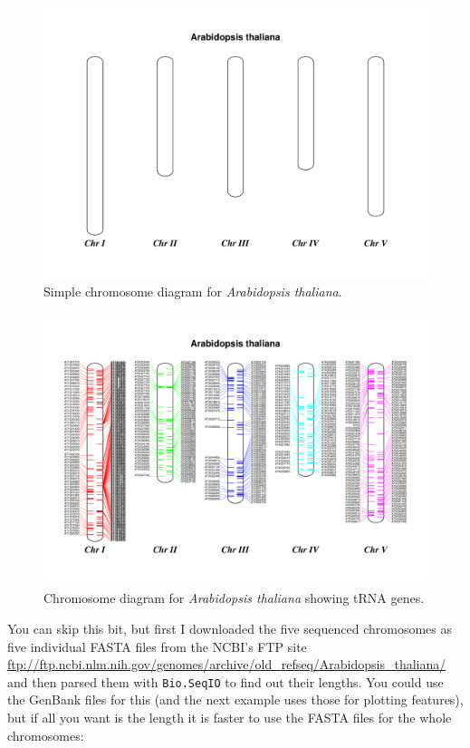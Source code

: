 \begin{latexonly}
\begin{figure}[p]
\centering
\includegraphics[scale=0.45]{images/simple_chrom.pdf}
\caption{Simple chromosome diagram for \textit{Arabidopsis thaliana}.}
\label{fig:simplechromosome}
\end{figure}
\begin{figure}[p]
\centering
\includegraphics[scale=0.45]{images/tRNA_chrom.pdf}
\caption{Chromosome diagram for \textit{Arabidopsis thaliana} showing tRNA genes.}
\label{fig:trnachromosome}
\end{figure}
\end{latexonly}

You can skip this bit, but first I downloaded the five sequenced chromosomes
as five individual FASTA files from the NCBI's FTP site
\url{ftp://ftp.ncbi.nlm.nih.gov/genomes/archive/old_refseq/Arabidopsis_thaliana/}
and then parsed them with \verb|Bio.SeqIO| to find out their lengths.  You
could use the GenBank files for this (and the next example uses those for
plotting features), but if all you want is the length it is faster to use the
FASTA files for the whole chromosomes:


